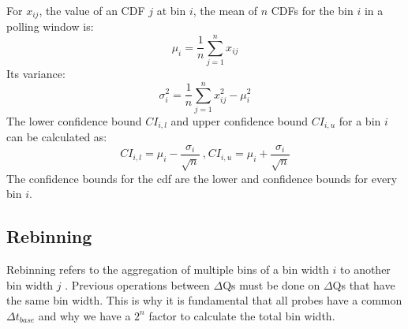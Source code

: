         For $x_{ij}$, the value of an CDF $j$ at bin $i$, the mean of $n$ CDFs for the bin $i$ in a polling window is:
            \begin{equation}
                \mu_i = \dfrac{1}{n} \sum_{j=1}^{n} x_{ij}
                \label{eq:mean_ecdf}
            \end{equation}
        Its variance:
            \begin{equation}
                \sigma^2_i = \dfrac{1}{n} \sum_{j=1}^{n} x^2_{ij} - \mu^2_i
                \label{eq:var_ecdf}
            \end{equation}
        The lower confidence bound $CI_{i, l}$ and upper confidence bound $CI_{i, u}$ for a bin $i$ can be calculated as:
        \begin{equation}
                CI_{i, l} = \mu_i - \dfrac{\sigma_i}{\sqrt{n}} \ \text{,} \ CI_{i, u} = \mu_i + \dfrac{\sigma_i}{\sqrt{n}}
            \label{eq:ci_i}
        \end{equation}
        The confidence bounds for the cdf are the lower and confidence bounds for every bin $i$.

        \subsection{Rebinning}
            Rebinning refers to the aggregation of multiple bins of a bin width $i$ to another bin width $j$ \cite{rebin}. 
            Previous operations between $\Delta$Qs must be done on $\Delta$Qs that have the same bin width. This is why it is fundamental that all probes have a common $\Delta t_{base}$ and why we have a $2^n$ factor to calculate the total bin width.

